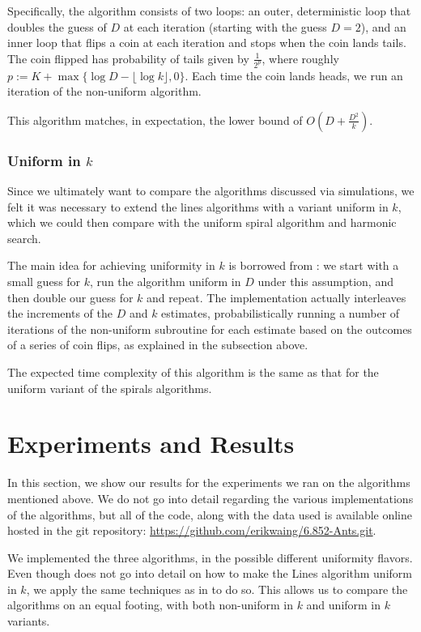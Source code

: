 \documentclass[runningheads,a4paper]{llncs}
\begin{document}
Specifically, the algorithm consists of two loops: an outer, deterministic loop that doubles the guess of $D$ at each iteration (starting with the guess $D = 2$), and an inner loop that flips a coin at each iteration and stops when the coin lands tails. The coin flipped has probability of tails given by $\frac{1}{2^p}$, where roughly $p := K + \max \{ \log D - \lfloor \log k \rfloor, 0 \}$. Each time the coin lands heads, we run an iteration of the non-uniform algorithm.

This algorithm matches, in expectation, the lower bound of $O(D + \frac{D^2}{k})$.

\subsubsection{Uniform in $k$}

Since we ultimately want to compare the algorithms discussed via simulations, we felt it was necessary to extend the lines algorithms with a variant uniform in $k$, which we could then compare with the uniform spiral algorithm and harmonic search.

The main idea for achieving uniformity in $k$ is borrowed from \cite{feinerman2012collaborative}: we start with a small guess for $k$, run the algorithm uniform in $D$ under this assumption, and then double our guess for $k$ and repeat. The implementation actually interleaves the increments of the $D$ and $k$ estimates, probabilistically running a number of iterations of the non-uniform subroutine for each estimate based on the outcomes of a series of coin flips, as explained in the subsection above.

The expected time complexity of this algorithm is the same as that for the uniform variant of the spirals algorithms.


\section{Experiments and Results}
\label{experiments}

In this section, we show our results for the experiments we ran on the algorithms mentioned above. We do not go into detail regarding the various implementations of the algorithms, but all of the code, along with the data used is available online hosted in the git repository: \url{https://github.com/erikwaing/6.852-Ants.git}. 

We implemented the three algorithms, in the possible different uniformity flavors. Even though \cite{lenzen2014trade} does not go into detail on how to make the Lines algorithm uniform in $k$, we apply the same techniques as in \cite{feinerman2012collaborative} to do so. This allows us to compare the algorithms on an equal footing, with both non-uniform in $k$ and uniform in $k$ variants. 
\end{document}
